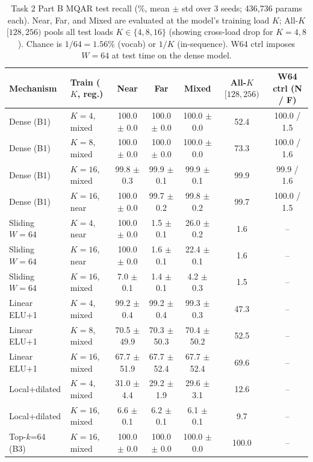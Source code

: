 \documentclass{article}
\begin{document}
\begin{table}[t]
\centering\footnotesize
\caption{Task 2 Part B MQAR test recall (\%, mean $\pm$ std over 3 seeds; 436,736 params each). Near, Far, and Mixed are evaluated at the model's training load $K$; All-$K$ $[128,256)$ pools all test loads $K\in\{4,8,16\}$ (showing cross-load drop for $K=4,8$). Chance is $1/64=1.56\%$ (vocab) or $1/K$ (in-sequence). W64 ctrl imposes $W=64$ at test time on the dense model.}
\label{tab:t2b}
\begin{tabular}{llccccc}
\toprule
Mechanism & Train ($K$, reg.) & Near & Far & Mixed & All-$K$ $[128,256)$ & W64 ctrl (N / F) \\
\midrule
Dense (B1) & $K=4$, mixed & 100.0 $\pm$ 0.0 & 100.0 $\pm$ 0.0 & 100.0 $\pm$ 0.0 & 52.4 & 100.0 / 1.5 \\
Dense (B1) & $K=8$, mixed & 100.0 $\pm$ 0.0 & 100.0 $\pm$ 0.0 & 100.0 $\pm$ 0.0 & 73.3 & 100.0 / 1.6 \\
Dense (B1) & $K=16$, mixed & 99.8 $\pm$ 0.3 & 99.9 $\pm$ 0.1 & 99.9 $\pm$ 0.1 & 99.9 & 99.9 / 1.6 \\
Dense (B1) & $K=16$, near & 100.0 $\pm$ 0.0 & 99.7 $\pm$ 0.2 & 99.8 $\pm$ 0.2 & 99.7 & 100.0 / 1.5 \\
\midrule
Sliding $W=64$ & $K=4$, near & 100.0 $\pm$ 0.0 & 1.5 $\pm$ 0.1 & 26.0 $\pm$ 0.2 & 1.6 & -- \\
Sliding $W=64$ & $K=16$, near & 100.0 $\pm$ 0.0 & 1.6 $\pm$ 0.1 & 22.4 $\pm$ 0.1 & 1.6 & -- \\
Sliding $W=64$ & $K=16$, mixed & 7.0 $\pm$ 0.1 & 1.4 $\pm$ 0.1 & 4.2 $\pm$ 0.3 & 1.5 & -- \\
\midrule
Linear ELU+1 & $K=4$, mixed & 99.2 $\pm$ 0.4 & 99.2 $\pm$ 0.4 & 99.3 $\pm$ 0.3 & 47.3 & -- \\
Linear ELU+1 & $K=8$, mixed & 70.5 $\pm$ 49.9 & 70.3 $\pm$ 50.3 & 70.4 $\pm$ 50.2 & 52.5 & -- \\
Linear ELU+1 & $K=16$, mixed & 67.7 $\pm$ 51.9 & 67.7 $\pm$ 52.4 & 67.7 $\pm$ 52.4 & 69.6 & -- \\
Local+dilated & $K=4$, mixed & 31.0 $\pm$ 4.4 & 29.2 $\pm$ 1.9 & 29.6 $\pm$ 3.1 & 12.6 & -- \\
Local+dilated & $K=16$, mixed & 6.6 $\pm$ 0.1 & 6.2 $\pm$ 0.1 & 6.1 $\pm$ 0.1 & 9.7 & -- \\
\midrule
Top-$k$=64 (B3) & $K=16$, mixed & 100.0 $\pm$ 0.0 & 100.0 $\pm$ 0.0 & 100.0 $\pm$ 0.0 & 100.0 & -- \\
\bottomrule
\end{tabular}
\end{table}
\end{document}
